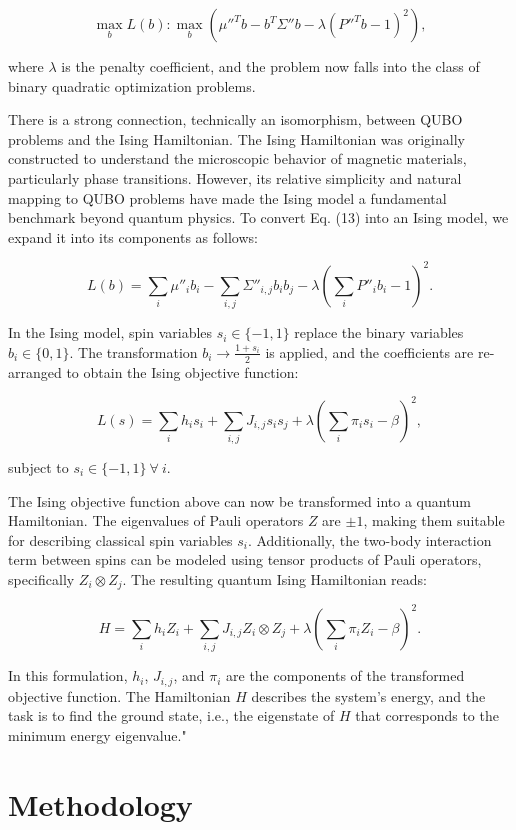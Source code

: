 \documentclass[%
 reprint,
 amsmath,amssymb,
 aps,
]{revtex4-2}
\begin{document}
\[
\max_b L(b) : \max_b \left( \mu''^T b - b^T \Sigma'' b - \lambda \left(P''^T b - 1 \right)^2 \right),
\tag{13}
\]

where $\lambda$ is the penalty coefficient, and the problem now falls into the class of binary quadratic optimization problems.

There is a strong connection, technically an isomorphism, between QUBO problems and the Ising Hamiltonian. The Ising Hamiltonian was originally constructed to understand the microscopic behavior of magnetic materials, particularly phase transitions. However, its relative simplicity and natural mapping to QUBO problems have made the Ising model a fundamental benchmark beyond quantum physics. To convert Eq. (13) into an Ising model, we expand it into its components as follows:

\[
L(b) = \sum_i \mu''_i b_i - \sum_{i,j} \Sigma''_{i,j} b_i b_j - \lambda \left(\sum_i P''_i b_i - 1\right)^2.
\tag{14}
\]

In the Ising model, spin variables $s_i \in \{-1, 1\}$ replace the binary variables $b_i \in \{0, 1\}$. The transformation $b_i \rightarrow \frac{1 + s_i}{2}$ is applied, and the coefficients are re-arranged to obtain the Ising objective function:

\[
L(s) = \sum_i h_i s_i + \sum_{i,j} J_{i,j} s_i s_j + \lambda \left( \sum_i \pi_i s_i - \beta \right)^2,
\tag{15}
\]

subject to $s_i \in \{-1, 1\} \ \forall \ i$.

The Ising objective function above can now be transformed into a quantum Hamiltonian. The eigenvalues of Pauli operators $Z$ are $\pm 1$, making them suitable for describing classical spin variables $s_i$. Additionally, the two-body interaction term between spins can be modeled using tensor products of Pauli operators, specifically $Z_i \otimes Z_j$. The resulting quantum Ising Hamiltonian reads:

\[
H = \sum_i h_i Z_i + \sum_{i,j} J_{i,j} Z_i \otimes Z_j + \lambda \left( \sum_i \pi_i Z_i - \beta \right)^2.
\tag{16}
\]

In this formulation, $h_i$, $J_{i,j}$, and $\pi_i$ are the components of the transformed objective function. The Hamiltonian $H$ describes the system’s energy, and the task is to find the ground state, i.e., the eigenstate of $H$ that corresponds to the minimum energy eigenvalue."



\section{Methodology}
\end{document}
